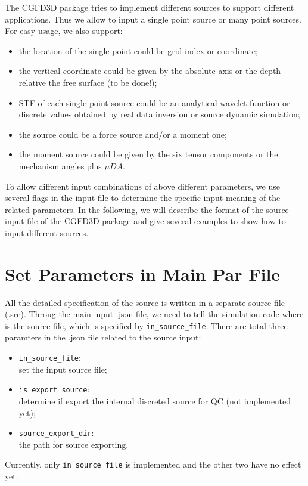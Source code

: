 The CGFD3D package tries to implement different sources to support different applications.
Thus we allow to input a single point source or many point sources.
For easy usage, we also support:
\begin{itemize}
    \item the location of the single point could be grid index or coordinate;
    \item the vertical coordinate could be given by the absolute axis or the depth relative the free surface (to be done!);
    \item STF of each single point source could be an analytical wavelet function or discrete values obtained by real data inversion or source dynamic simulation;
    \item the source could be a force source and/or a moment one;
    \item the  moment source could be given by the six tensor components or the mechanism angles plus $\mu DA$.
\end{itemize}


To allow different input combinations of above different parameters, 
we use several flags in the input file to determine the specific input meaning of the related parameters.
In the following, we will describe the format of the source input file of the CGFD3D package
 and give several examples to show how to input different sources.


\section{Set Parameters in Main Par File} \label{src_json}

All the detailed specification of the source is written in a separate source file (.src).
Throug the main input .json file, we need to tell the simulation code where is the source file,
which is specified by \verb|in_source_file|.
There are total three paramters in the .json file related to the source input:
\begin{itemize}
  \item \verb|in_source_file|: \\
     set the input source file;
  \item \verb|is_export_source|: \\
     determine if export the internal discreted source for QC (not implemented yet);
  \item \verb|source_export_dir|: \\
     the path for source exporting.
\end{itemize}
Currently, only \verb|in_source_file| is implemented and the other two have no effect yet.

